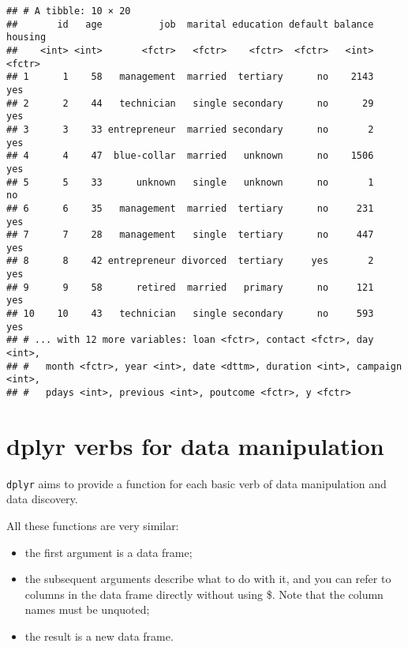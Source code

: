 \documentclass[]{book}
\newenvironment{Shaded}{\begin{snugshade}}{\end{snugshade}}
\newcommand{\KeywordTok}[1]{\textcolor[rgb]{0.13,0.29,0.53}{\textbf{{#1}}}}
\newcommand{\DataTypeTok}[1]{\textcolor[rgb]{0.13,0.29,0.53}{{#1}}}
\newcommand{\DecValTok}[1]{\textcolor[rgb]{0.00,0.00,0.81}{{#1}}}
\newcommand{\StringTok}[1]{\textcolor[rgb]{0.31,0.60,0.02}{{#1}}}
\newcommand{\NormalTok}[1]{{#1}}
\providecommand{\tightlist}{%
  \setlength{\itemsep}{0pt}\setlength{\parskip}{0pt}}
\def\tightlist{}
\begin{document}
\begin{Shaded}
\end{Shaded}

\begin{verbatim}
## # A tibble: 10 × 20
##       id   age          job  marital education default balance housing
##    <int> <int>       <fctr>   <fctr>    <fctr>  <fctr>   <int>  <fctr>
## 1      1    58   management  married  tertiary      no    2143     yes
## 2      2    44   technician   single secondary      no      29     yes
## 3      3    33 entrepreneur  married secondary      no       2     yes
## 4      4    47  blue-collar  married   unknown      no    1506     yes
## 5      5    33      unknown   single   unknown      no       1      no
## 6      6    35   management  married  tertiary      no     231     yes
## 7      7    28   management   single  tertiary      no     447     yes
## 8      8    42 entrepreneur divorced  tertiary     yes       2     yes
## 9      9    58      retired  married   primary      no     121     yes
## 10    10    43   technician   single secondary      no     593     yes
## # ... with 12 more variables: loan <fctr>, contact <fctr>, day <int>,
## #   month <fctr>, year <int>, date <dttm>, duration <int>, campaign <int>,
## #   pdays <int>, previous <int>, poutcome <fctr>, y <fctr>
\end{verbatim}

\clearpage

\section{dplyr verbs for data
manipulation}\label{dplyr-verbs-for-data-manipulation}

\texttt{dplyr} aims to provide a function for each basic verb of data
manipulation and data discovery.

All these functions are very similar:

\begin{itemize}
\tightlist
\item
  the first argument is a data frame;
\item
  the subsequent arguments describe what to do with it, and you can
  refer to columns in the data frame directly without using \$. Note
  that the column names must be unquoted;
\item
  the result is a new data frame.
\end{itemize}
\end{document}
